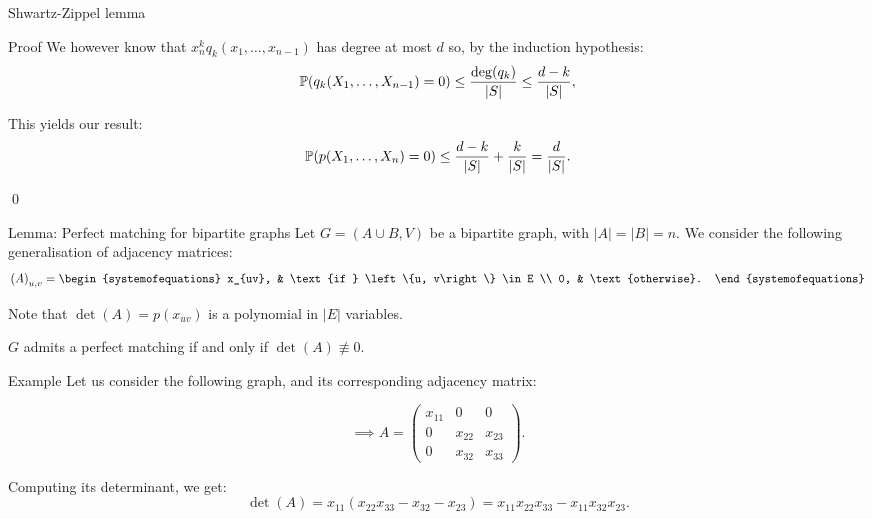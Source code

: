 \documentclass[a4paper]{article}
\begin{document}
\begin{parag}{Shwartz-Zippel lemma}
\begin{subparag}{Proof}
        We however know that $x_n^k q_k\left(x_1, \ldots, x_{n-1}\right)$ has degree at most $d$ so, by the induction hypothesis: 
        \[\prob\left(q_k\left(X_1, \ldots, X_{n-1}\right) = 0\right) \leq \frac{\deg\left(q_k\right)}{\left|S\right|} \leq \frac{d-k}{\left|S\right|},\]
        
        This yields our result: 
        \[\prob\left(p\left(X_1, \ldots, X_n\right) = 0\right) \leq \frac{d-k}{\left|S\right|} + \frac{k}{\left|S\right|} = \frac{d}{\left|S\right|}.\]

        \qed
    \end{subparag}
\end{parag}

\begin{parag}{Lemma: Perfect matching for bipartite graphs}
    Let $G = \left(A \cup B, V\right)$ be a bipartite graph, with $\left|A\right| = \left|B\right| = n$. We consider the following generalisation of adjacency matrices: 
    \[\left(A\right)_{u, v} = \begin{systemofequations} x_{uv}, & \text{if } \left\{u, v\right\} \in E \\ 0, & \text{otherwise}. \end{systemofequations}\]

    Note that $\det\left(A\right) = p\left(x_{uv}\right)$ is a polynomial in $\left|E\right|$ variables.

    $G$ admits a perfect matching if and only if $\det\left(A\right) \not\equiv 0$.

    \begin{subparag}{Example}
        Let us consider the following graph, and its corresponding adjacency matrix:
        \begin{center}
        \begin{minipage}{0.25\textwidth}
        \end{minipage}
        \begin{minipage}{0.45\textwidth}
        \[\implies A = \begin{pmatrix} x_{11} & 0 & 0 \\ 0 & x_{22} & x_{23} \\ 0 & x_{32} & x_{33} \end{pmatrix}. \]
        \end{minipage}
        \end{center}
        
        Computing its determinant, we get:
        \[\det\left(A\right) = x_{11} \left(x_{22} x_{33} - x_{32} - x_{23}\right) = x_{11} x_{22} x_{33} - x_{11} x_{32} x_{23}.\]
        

\end{subparag}
\end{parag}
\end{document}
